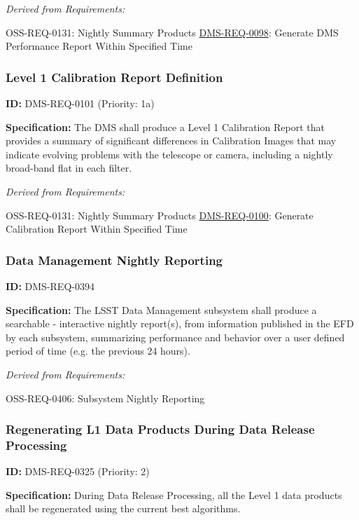 \documentclass[SE,toc,lsstdraft]{lsstdoc}
\begin{document}
\emph{Derived from Requirements:}

OSS-REQ-0131:
Nightly Summary Products \newline
\hyperref[DMS-REQ-0098]{DMS-REQ-0098}:
Generate DMS Performance Report Within Specified Time \newline

\subsubsection{Level 1 Calibration Report Definition}

\label{DMS-REQ-0101}
\textbf{ID:} DMS-REQ-0101 (Priority: 1a)

\textbf{Specification:} The DMS shall produce a Level 1 Calibration Report that provides a summary of significant differences in Calibration Images that may indicate evolving problems with the telescope or camera, including a nightly broad-band flat in each filter.

\emph{Derived from Requirements:}

OSS-REQ-0131:
Nightly Summary Products \newline
\hyperref[DMS-REQ-0100]{DMS-REQ-0100}:
Generate Calibration Report Within Specified Time \newline

\subsubsection{Data Management Nightly Reporting}

\label{DMS-REQ-0394}
\textbf{ID:} DMS-REQ-0394

\textbf{Specification:} The LSST Data Management subsystem shall produce a searchable - interactive nightly report(s), from information published in the EFD by each subsystem, summarizing performance and behavior over a user defined period of time (e.g. the previous 24 hours).

\emph{Derived from Requirements:}

OSS-REQ-0406:
Subsystem Nightly Reporting \newline

\subsubsection{Regenerating L1 Data Products During Data Release Processing}

\label{DMS-REQ-0325}
\textbf{ID:} DMS-REQ-0325 (Priority: 2)

\textbf{Specification:} During Data Release Processing, all the Level 1 data products shall be regenerated using the current best algorithms.
\end{document}
